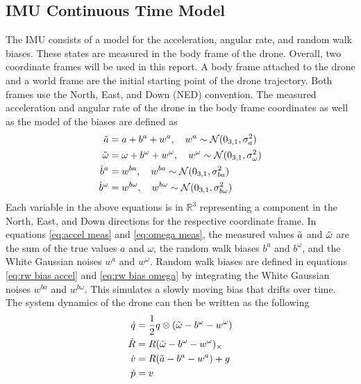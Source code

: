 \subsection{IMU Continuous Time Model}
The IMU consists of a model for the acceleration, angular rate, and random walk biases. These states are measured in the body frame of the drone. Overall, two coordinate frames will be used in this report. A body frame attached to the drone and a world frame are the initial starting point of the drone trajectory. Both frames use the North, East, and Down (NED) convention. The measured acceleration and angular rate of the drone in the body frame coordinates as well as the model of the biases are defined as
\begin{subequations} \label{eq: measurement model}
    \begin{align}
        \Tilde{a} &= a + b^a + w^a, \quad w^a \sim \mathcal{N}(0_{3,1}, \sigma_{a}^2) \label{eq:accel meas} \\
        \Tilde{\omega} &= \omega + b^{\omega} + w^{\omega}, \quad w^{\omega} \sim \mathcal{N}(0_{3,1}, \sigma_{\omega}^2) \label{eq:omega meas} \\
        \dot{b}^a &= w^{ba}, \quad w^{ba} \sim \mathcal{N}(0_{3,1}, \sigma_{ba}^2) \label{eq:rw bias accel} \\
        \dot{b}^{\omega} &= w^{b\omega}, \quad w^{b\omega} \sim \mathcal{N}(0_{3,1}, \sigma_{b\omega}^2) \label{eq:rw bias omega}
    \end{align}
\end{subequations}
Each variable in the above equations is in $\mathbb{R}^3$ representing a component in the North, East, and Down directions for the respective coordinate frame. In equations \eqref{eq:accel meas} and \eqref{eq:omega meas}, the measured values $\Tilde{a}$ and $\Tilde{\omega}$ are the sum of the true values $a$ and $\omega$, the random walk biases $b^a$ and $b^{\omega}$, and the White Gaussian noises $w^a$ and $w^{\omega}$. Random walk biases are defined in equations \eqref{eq:rw bias accel} and \eqref{eq:rw bias omega} by integrating the White Gaussian noises $w^{ba}$ and $w^{b\omega}$. This simulates a slowly moving bias that drifts over time. The system dynamics of the drone can then be written as the following
\begin{subequations} \label{eq: state dynamics}
    \begin{align}
        \dot{q} &= \frac{1}{2} q \otimes (\Tilde{\omega} - b^{\omega} - w^{\omega}) \label{eq:q dot} \\
        \dot{R} &= R (\Tilde{\omega} - b^{\omega} - w^{\omega})_{\times} \label{eq:R dot} \\
        \dot{v} &= R (\Tilde{a} - b^{a} - w^{a}) + g \label{eq:v dot} \\
        \dot{p} &= v \label{eq:p dot}
    \end{align}
\end{subequations}
